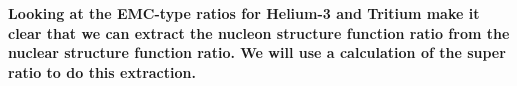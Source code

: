 \textbf{Looking at the EMC-type ratios for Helium-3 and Tritium make it clear that we can extract the nucleon structure function ratio from the nuclear structure function ratio. We will use a calculation of the super ratio to do this extraction.}